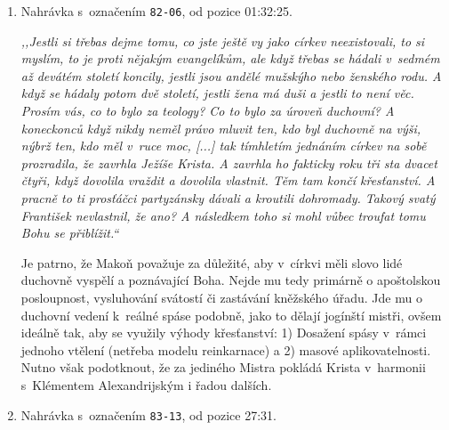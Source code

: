 \begin{enumerate}

\item{
Nahrávka s~označením \texttt{82-06}, od pozice 01:32:25.

\textit{%
,,Jestli si třebas dejme tomu, co jste ještě vy jako církev neexistovali, to si
myslím, to je proti nějakým evangelíkům, ale když třebas se hádali v~sedmém až
devátém století koncily, jestli jsou andělé mužskýho nebo ženského rodu. A když
se hádaly potom dvě století, jestli žena má duši a jestli to není věc. Prosím
vás, co to bylo za teology? Co to bylo za úroveň duchovní? A koneckonců když
nikdy neměl právo mluvit ten, kdo byl duchovně na výši, nýbrž ten, kdo měl
v~ruce moc, [...] tak tímhletím jednáním církev na sobě prozradila,
že zavrhla Ježíše Krista. A zavrhla ho fakticky roku tři sta dvacet čtyři, když
dovolila vraždit a dovolila vlastnit. Těm tam končí křesťanství. A pracně to ti
prosťáčci partyzánsky dávali a kroutili dohromady. Takový svatý František
nevlastnil, že ano? A následkem toho si mohl vůbec troufat tomu Bohu se
přiblížit.``
}

Je patrno, že Makoň považuje za důležité, aby v~církvi měli slovo lidé duchovně
vyspělí a poznávající Boha. Nejde mu tedy primárně o apoštolskou posloupnost,
vysluhování svátostí či zastávání kněžského úřadu. Jde mu o duchovní vedení
        k~reálné spáse podobně, jako to dělají jogínští mistři, ovšem ideálně
        tak, aby se využily výhody křesťanství: 1) Dosažení spásy v~rámci jednoho
        vtělení (netřeba modelu reinkarnace) a 2) masové aplikovatelnosti. Nutno
        však podotknout, že za jediného Mistra pokládá Krista v~harmonii
        s~Klémentem Alexandrijským\cite{klement2019vychovatel} i řadou dalších.

}

\item{
Nahrávka s~označením \texttt{83-13}, od pozice 27:31.

}
\end{enumerate}
